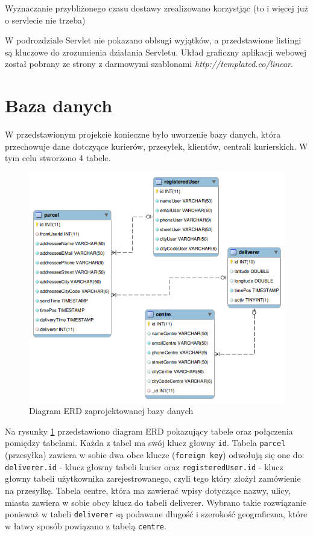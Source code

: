 \documentclass[eng,printmode,oneside]{mgr}
\begin{document}
Wyznaczanie przybliżonego czasu dostawy zrealizowano korzystjąc (to i więcej już
o servlecie nie trzeba)

W podrozdziale Servlet nie pokazano obłsugi wyjątków, a przedstawione listingi
są kluczowe do zrozumienia działania Servletu. Układ graficzny aplikacji webowej
został pobrany ze strony z darmowymi szablonami
{\textit{http://templated.co/linear}}.

\section{Baza danych}

W przedstawionym projekcie konieczne było uworzenie bazy danych, która
przechowuje dane dotczyące kurierów, przesyłek, klientów, centrali kurierskich.
W tym celu stworzono 4 tabele. 

\begin{figure}[ht!]
\centering
\includegraphics[width=70ex]{ERD.png}
\caption{Diagram ERD zaprojektowanej bazy danych}
\label{ERD}
\end{figure}

Na rysunky \ref{ERD} przedstawiono diagram ERD pokazujący tabele oraz połączenia
pomiędzy tabelami. Każda z tabel ma swój klucz głowny \texttt{id}. Tabela
\texttt{parcel} (przesyłka) zawiera w sobie dwa obce klucze (\texttt{foreign
key}) odwołują się one do: \texttt{deliverer.id} - klucz głowny
tabeli kurier oraz \texttt{registeredUser.id} - klucz głowny tabeli użytkownika zarejestrowanego,
czyli tego który złożył zamówienie na przesyłkę. Tabela centre, która ma
zawierać wpisy dotyczące nazwy, ulicy, miasta zawiera w sobie obcy klucz do
tabeli deliverer. Wybrano takie rozwiązanie ponieważ w tabeli \texttt{deliverer}
są podawane długość i szerokość geograficzna, które w łatwy sposób powiązano z
tabelą \texttt{centre}.
\end{document}

